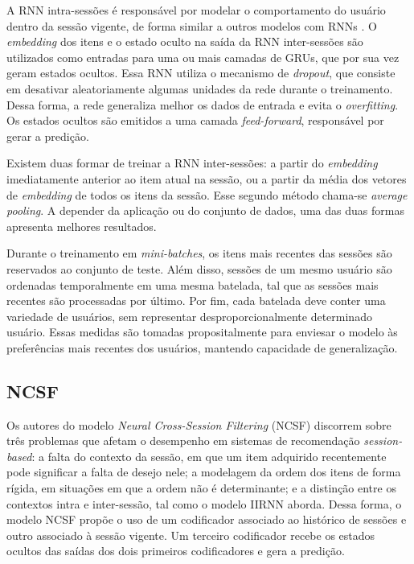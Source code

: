 A RNN intra-sessões é responsável por modelar o comportamento do usuário dentro
da sessão vigente, de forma similar a outros modelos com RNNs
\cite{HidasiKBT15}. O \textit{embedding} dos itens e o estado oculto na saída da
RNN inter-sessões são utilizados como entradas para uma ou mais camadas de GRUs,
que por sua vez geram estados ocultos. Essa RNN utiliza o mecanismo de
\textit{dropout}, que consiste em desativar aleatoriamente algumas unidades da
rede durante o treinamento. Dessa forma, a rede generaliza melhor os dados de
entrada e evita o \textit{overfitting}. Os estados ocultos são emitidos a uma camada
\textit{feed-forward}, responsável por gerar a predição.

Existem duas formar de treinar a RNN inter-sessões: a partir do
\textit{embedding} imediatamente anterior ao item atual na sessão, ou a partir
da média dos vetores de \textit{embedding} de todos os itens da sessão. Esse
segundo método chama-se \textit{average pooling}. A depender da aplicação ou do
conjunto de dados, uma das duas formas apresenta melhores resultados.

Durante o treinamento em \textit{mini-batches}, os itens mais recentes das
sessões são reservados ao conjunto de teste. Além disso, sessões de um mesmo
usuário são ordenadas temporalmente em uma mesma batelada, tal que as
sessões mais recentes são processadas por último. Por fim, cada batelada
deve conter uma variedade de usuários, sem representar desproporcionalmente
determinado usuário. Essas medidas são tomadas propositalmente para enviesar o
modelo às preferências mais recentes dos usuários, mantendo capacidade de
generalização. 

\subsection{NCSF}
Os autores do modelo \textit{Neural Cross-Session Filtering} (NCSF) discorrem
sobre três problemas que afetam o desempenho em sistemas de recomendação
\textit{session-based}: a falta do contexto da sessão, em que um item adquirido
recentemente pode significar a falta de desejo nele; a modelagem da ordem dos
itens de forma rígida, em situações em que a ordem não é determinante; e a
distinção entre os contextos intra e inter-sessão, tal como o modelo IIRNN aborda.
Dessa forma, o modelo NCSF propõe o uso de um codificador associado ao histórico de sessões
e outro associado à sessão vigente. Um terceiro codificador recebe os estados ocultos das saídas
dos dois primeiros codificadores e gera a predição.

